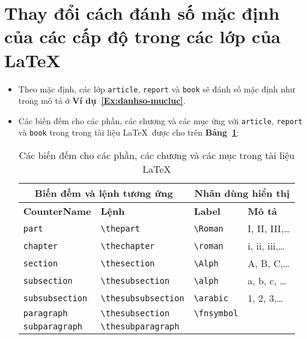 \documentclass[12pt,a4paper]{article}
\newcommand{\tab}[1]{\textbf{Bảng~#1}}
\newcommand{\ex}[1]{\textbf{Ví dụ~#1}}
\newcommand{\head}[1]{\textbf{#1}}
\begin{document}
\section{Thay đổi cách đánh số mặc định của các cấp độ trong các lớp của \LaTeX}
\begin{itemize}
  \item Theo mặc định, các lớp \Verb|article|, \Verb|report| và \Verb|book| sẽ đánh số mặc định như trong mô tả ở \ex{\ref{Ex:danhso-mucluc}}.

  \item Các biến đếm cho các phần, các chương và các mục ứng với \Verb|article|, \Verb|report| và \Verb|book| trong trong tài liệu \LaTeX\ được cho trên \tab{\ref{Tab:biendem-cautruc}}:
        \begin{table}[h]
          \begin{center}
            \begin{tabular}{llll}\toprule
              \multicolumn{2}{c}{\head{Biến đếm và lệnh tương ứng}} & \multicolumn{2}{c}{\head{Nhãn dùng hiển thị}}                                        \\ \midrule
              \head{CounterName}                                    & \head{Lệnh}                                   & \head{Label}     & \head{Mô tả}      \\ \midrule
              \Verb|part|                                           & \Verb|\thepart|                               & \Verb|\Roman|    & I, II, III,\ldots \\ \midrule
              \Verb|chapter|                                        & \Verb|\thechapter|                            & \Verb|\roman|    & i, ii, iii,\ldots \\ \midrule
              \Verb|section|                                        & \Verb|\thesection|                            & \Verb|\Alph|     & A, B, C,\ldots    \\ \midrule
              \Verb|subsection|                                     & \Verb|\thesubsection|                         & \Verb|\alph|     & a, b, c, \ldots   \\ \midrule
              \Verb|subsubsection|                                  & \Verb|\thesubsubsection|                      & \Verb|\arabic|   & 1, 2, 3,\ldots    \\ \midrule
              \Verb|paragraph|                                      & \Verb|\thesubsection|                         & \Verb|\fnsymbol| &                   \\ \midrule
              \Verb|subparagraph|                                   & \Verb|\thesubparagraph|                       &                  &                   \\ \bottomrule
            \end{tabular}
          \end{center}
          \caption{Các biến đếm cho các phần, các chương và các mục trong tài liệu \LaTeX} \label{Tab:biendem-cautruc}
        \end{table}


\end{itemize}
\end{document}
